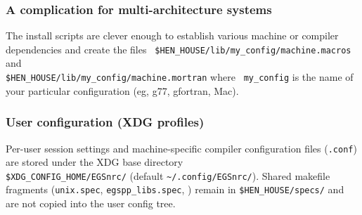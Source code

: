 \subsubsection{A complication for multi-architecture systems}
The install scripts are clever enough to establish various machine or
compiler dependencies and create the files {\tt
\$HEN\_HOUSE/lib/{my\_config}/machine.macros} and\\
 {\tt \$HEN\_HOUSE/lib/{my\_config}/machine.mortran} where {\tt
{my\_config}} is the name of your particular configuration (eg, g77,
gfortran, Mac).

\subsubsection{User configuration (XDG profiles)}
\label{xdg_config}

Per-user session settings and machine-specific
compiler configuration files ({\tt *.conf}) are stored under the XDG base
directory\\
\verb+$XDG_CONFIG_HOME/EGSnrc/+ (default \verb+~/.config/EGSnrc/+).
Shared makefile fragments ({\tt unix.spec}, {\tt egspp\_libs.spec}, \etc)
remain in \verb+$HEN_HOUSE/specs/+ and are not copied into the user config tree.

